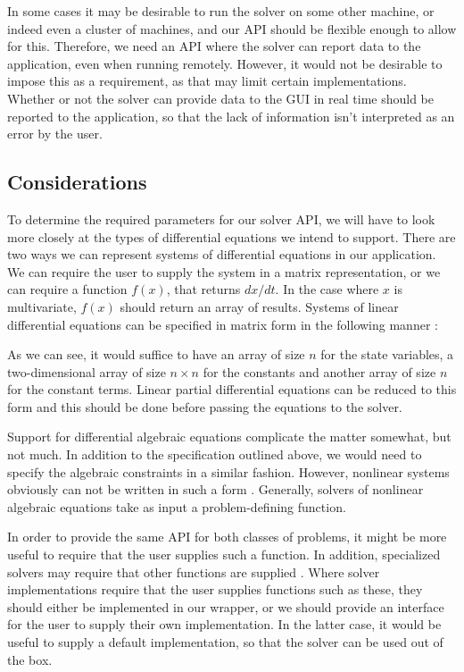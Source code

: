 \documentclass[\rootfolder/main.tex]{subfiles}
\begin{document}
In some cases it may be desirable to run the solver on some other machine, or indeed even a cluster of machines, and our API should be flexible enough to allow for this.
Therefore, we need an API where the solver can report data to the application, even when running remotely.
However, it would not be desirable to impose this as a requirement, as that may limit certain implementations.
Whether or not the solver can provide data to the GUI in real time should be reported to the application, so that the lack of information isn't interpreted as an error by the user.

\subsection{Considerations}

To determine the required parameters for our solver API, we will have to look more closely at the types of differential equations we intend to support.
There are two ways we can represent systems of differential equations in our application.
We can require the user to supply the system in a matrix representation, or we can require a function $f(x)$, that returns $dx/dt$.
In the case where $x$ is multivariate, $f(x)$ should return an array of results.
Systems of linear differential equations can be specified in matrix form in the following manner \cite{kreyzig}:


As we can see, it would suffice to have an array of size $n$ for the state variables,
a two-dimensional array of size $n \times n$ for the constants and another array of size $n$ for the constant terms.
Linear partial differential equations can be reduced to this form and this should be done before passing the equations to the solver.

Support for differential algebraic equations complicate the matter somewhat, but not much.
In addition to the specification outlined above, we would need to specify the algebraic constraints in a similar fashion.
However, nonlinear systems obviously can not be written in such a form \cite{khalil}.
Generally, solvers of nonlinear algebraic equations take as input a problem-defining function.

In order to provide the same API for both classes of problems, it might be more useful to require that the user supplies such a function.
In addition, specialized solvers may require that other functions are supplied \cite{kinsol}\cite{cvode}\cite{ida}.
Where solver implementations require that the user supplies functions such as these, they should either be implemented in our wrapper,
or we should provide an interface for the user to supply their own implementation.
In the latter case, it would be useful to supply a default implementation, so that the solver can be used out of the box.
\end{document}
